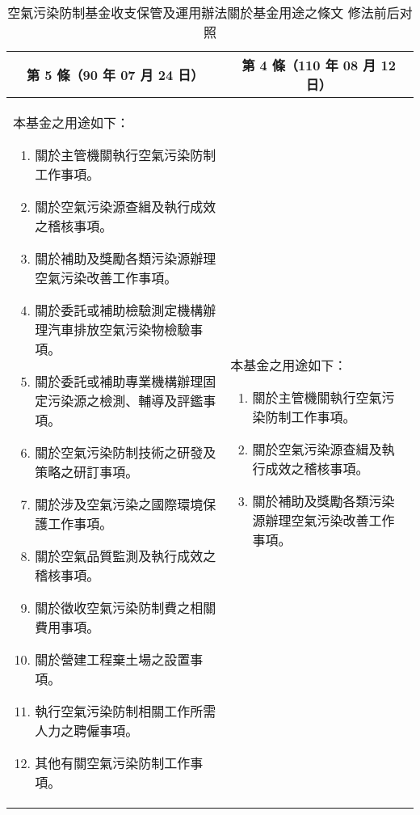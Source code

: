 \begin{table}[h]
    \centering
    \caption{空氣污染防制基金收支保管及運用辦法關於基金用途之條文 修法前后对照}
    \hspace{12pt}%
    \begin{tabular}{|p{7.5cm}|p{7.5cm}|}
    \hline
    \multicolumn{1}{|c|}{第 5 條（90 年 07 月 24 日）} & \multicolumn{1}{c|}{第 4 條（110 年 08 月 12 日）} \\
    \hline
    本基金之用途如下：
      \begin{enumerate}[label=\zhnum*、,topsep=0.5em, partopsep=0pt, itemsep=0pt, parsep=0pt,leftmargin=3em]
    \item  關於主管機關執行空氣污染防制工作事項。
    \item  關於空氣污染源查緝及執行成效之稽核事項。
    \item  關於補助及獎勵各類污染源辦理空氣污染改善工作事項。
    \item  關於委託或補助檢驗測定機構辦理汽車排放空氣污染物檢驗事項。
    \item  關於委託或補助專業機構辦理固定污染源之檢測、輔導及評鑑事項。
    \item  關於空氣污染防制技術之研發及策略之研訂事項。
    \item  關於涉及空氣污染之國際環境保護工作事項。
    \item  關於空氣品質監測及執行成效之稽核事項。
    \item  關於徵收空氣污染防制費之相關費用事項。
    \item  關於營建工程棄土場之設置事項。
    \item  執行空氣污染防制相關工作所需人力之聘僱事項。
    \item  其他有關空氣污染防制工作事項。
    \end{enumerate}  
    & 
    本基金之用途如下：
    \begin{enumerate}[label=\zhnum*、,topsep=0.5em, partopsep=0pt, itemsep=0pt, parsep=0pt,leftmargin=3em]
    \item  關於主管機關執行空氣污染防制工作事項。
    \item  關於空氣污染源查緝及執行成效之稽核事項。
    \item  關於補助及獎勵各類污染源辦理空氣污染改善工作事項。

\end{enumerate}
\end{tabular}
\end{table}
